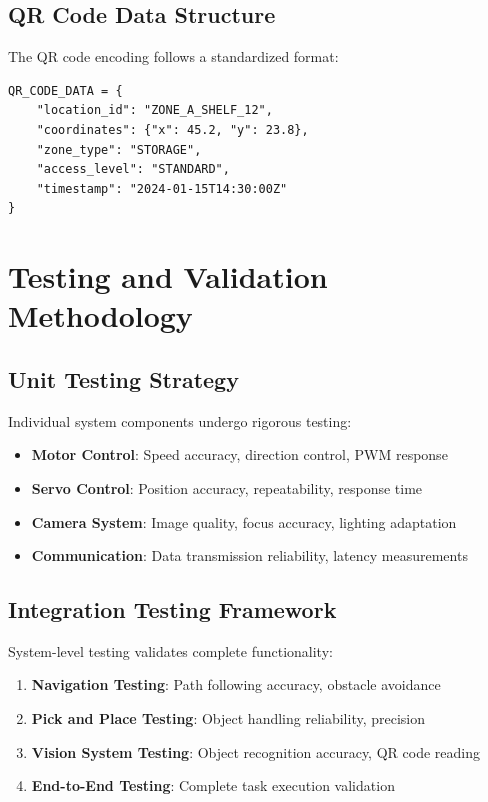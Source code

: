 \subsection{QR Code Data Structure}
The QR code encoding follows a standardized format:

\begin{verbatim}
QR_CODE_DATA = {
    "location_id": "ZONE_A_SHELF_12",
    "coordinates": {"x": 45.2, "y": 23.8},
    "zone_type": "STORAGE",
    "access_level": "STANDARD",
    "timestamp": "2024-01-15T14:30:00Z"
}
\end{verbatim}

\section{Testing and Validation Methodology}

\subsection{Unit Testing Strategy}
Individual system components undergo rigorous testing:

\begin{itemize}
\item \textbf{Motor Control}: Speed accuracy, direction control, PWM response
\item \textbf{Servo Control}: Position accuracy, repeatability, response time
\item \textbf{Camera System}: Image quality, focus accuracy, lighting adaptation
\item \textbf{Communication}: Data transmission reliability, latency measurements
\end{itemize}

\subsection{Integration Testing Framework}
System-level testing validates complete functionality:

\begin{enumerate}
\item \textbf{Navigation Testing}: Path following accuracy, obstacle avoidance
\item \textbf{Pick and Place Testing}: Object handling reliability, precision
\item \textbf{Vision System Testing}: Object recognition accuracy, QR code reading
\item \textbf{End-to-End Testing}: Complete task execution validation
\end{enumerate}


